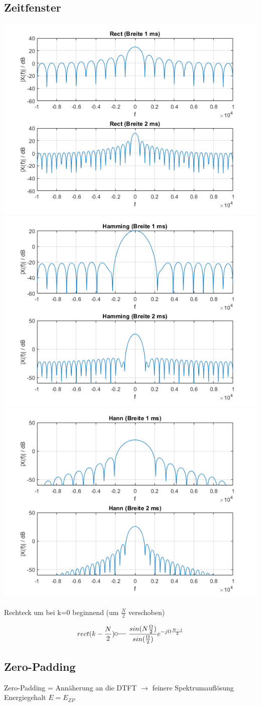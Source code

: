 \documentclass[10pt,a4paper]{article}
\begin{document}
\subsection{Zeitfenster}
  \begin{center}
      \includegraphics[width=.16\textwidth]{./img/rect.png}
      \includegraphics[width=.16\textwidth]{./img/hamming.png}
      \includegraphics[width=.16\textwidth]{./img/hann.png}
  \end{center}
  Rechteck um bei k=0 beginnend (um $\frac{N}{2}$ verschoben)
  \begin{mdframed}[style=exercise]
    \begin{align}
        rect(k-\frac{N}{2}) \fourier \frac{sin(N\frac{\Omega}{2})}{sin(\frac{\Omega}{2})} e^{-j\Omega\frac{N-1}{2}}
    \end{align}
  \end{mdframed}
\subsection{Zero-Padding}
Zero-Padding = Annäherung an die DTFT $\rightarrow$ feinere Spektrumauflösung Energiegehalt $E = E_{ZP}$ \\
\end{document}
